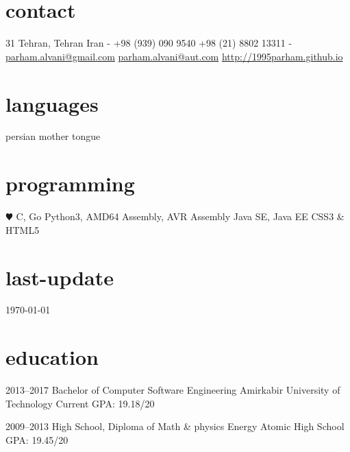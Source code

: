 \documentclass[]{friggeri-cv} %
\begin{document}


\begin{aside} %
\section{contact}
31
Tehran, Tehran
Iran
-
+98 (939) 090 9540
+98 (21) 8802 13311
-
\href{mailto:parham.alvani@gmail.com}{parham.alvani@gmail.com}
\href{mailto:parham.alvani@aut.com}{parham.alvani@aut.com}
\href{http://1995parham.github.io/}{http://1995parham.github.io}
\section{languages}
persian mother tongue
\section{programming}
{\color{red} $\varheartsuit$} C, Go
Python3, AMD64 Assembly, AVR Assembly
Java SE, Java EE
CSS3 \& HTML5
\section{last-update}
\today
\end{aside}


\section{education}

\begin{entrylist}


\entry
{2013--2017}
{Bachelor {\normalfont of Computer Software Engineering}}
{Amirkabir University of Technology}
{Current GPA: 19.18/20}


\entry
{2009--2013}
{High School, {\normalfont Diploma of Math \& physics}}
{Energy Atomic High School}
{GPA: 19.45/20}



\end{entrylist}
\end{document}
